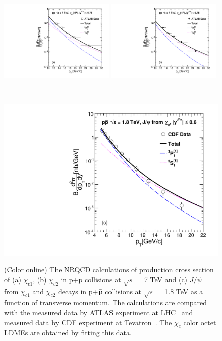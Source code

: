 \documentclass[12pt,a4paper,final]{iopart}
\begin{document}
\begin{figure}
\begin{minipage}{1.0\linewidth}
\centering
{\includegraphics[width=0.49\textwidth]{Fig1a_Chic1_ATLAS_Fit.pdf}}
{\includegraphics[width=0.49\textwidth]{Fig1b_Chic2_ATLAS_Fit.pdf}}
\end{minipage}%
\ \\
\centering
\begin{minipage}{0.5\linewidth}
\centering
{\includegraphics[width=1.0\textwidth]{Fig1c_Chic1_CDF_Fit.pdf}}
\end{minipage}%
\caption{(Color online) The NRQCD calculations of production cross section 
of (a) $\chi_{c1}$, (b) $\chi_{c2}$ in p+p collisions at
$\sqrt{s}$ = 7 TeV and (c) $J/\psi$ from $\chi_{c1}$ and $\chi_{c2}$ 
decays in p+${\bar {\rm p}}$ collisions at $\sqrt{s}$ = 1.8 TeV as 
a function of transverse momentum. The calculations are compared with 
the measured data by ATLAS experiment at LHC~\cite{ATLAS:2014ala}
and measured data by CDF experiment at Tevatron~\cite{Abe:1997yz}. 
The $\chi_{c}$ color octet LDMEs are obtained by fitting this data.}
\label{Fig:LDMEChicATLAS}
\end{figure}
\end{document}
